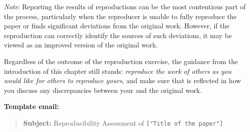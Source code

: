 \documentclass[
]{book}
\begin{document}
\emph{Note}: Reporting the results of reproductions can be the most contentious part of the process, particularly when the reproducer is unable to fully reproduce the paper or finds significant deviations from the original work. However, if the reproduction can correctly identify the sources of such deviations, it may be viewed as an improved version of the original work.

Regardless of the outcome of the reproduction exercise, the guidance from the introduction of this chapter still stands: \emph{reproduce the work of others as you would like for others to reproduce yours}, and make sure that is reflected in how you discuss any discrepancies between your and the original work.

\textbf{Template email:}

\begin{quote}
\textbf{Subject:} Reproducibility Assessment of \texttt{{[}"Title\ of\ the\ paper"{]}}
\end{quote}
\end{document}
